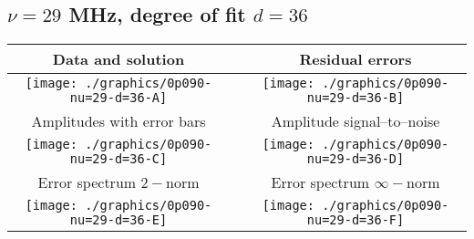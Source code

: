 

% 

\clearpage{}
\break{}

\subsection{$\nu = 29$ MHz, degree of fit $d = 36$}

\begin{table}[h]
    \begin{center}
        \begin{tabular}{ccc}
            Data and solution & \quad & Residual errors \\\hline
            \texttt{[image: ./graphics/0p090-nu=29-d=36-A]} &&
            \texttt{[image: ./graphics/0p090-nu=29-d=36-B]} \\[15pt]
            Amplitudes with error bars && Amplitude signal--to--noise \\\hline
            \texttt{[image: ./graphics/0p090-nu=29-d=36-C]} &&
            \texttt{[image: ./graphics/0p090-nu=29-d=36-D]} \\[15pt]
            Error spectrum $2-$norm && Error spectrum $\infty-$norm \\\hline
            \texttt{[image: ./graphics/0p090-nu=29-d=36-E]} &&
            \texttt{[image: ./graphics/0p090-nu=29-d=36-F]} \\[15pt]
        \end{tabular}
    \end{center}
\label{fig:elev=90, nu=29}
\end{table}



\endinput
